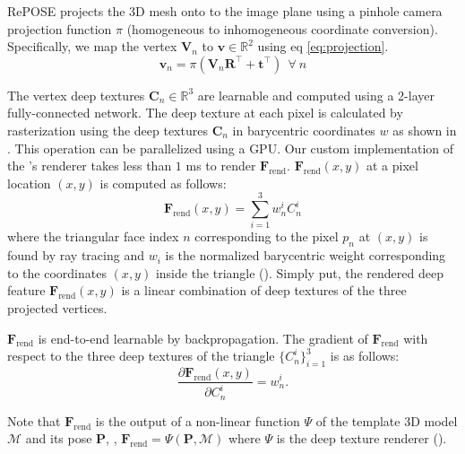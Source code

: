 \documentclass[10pt,twocolumn,letterpaper]{article}
\begin{document}
RePOSE projects the 3D mesh onto to the image plane using a pinhole camera projection function $\pi$ (homogeneous to inhomogeneous coordinate conversion). Specifically, we map the vertex $\mathbf{V}_n$ to $\mathbf{v} \in \mathbb{R}^{2}$ using eq \ref{eq:projection}. 
\begin{equation}
   \mathbf{v}_n = \pi \left( \mathbf{V}_n \mathbf{R}^{\top} + \mathbf{t}^{\top} \right) ~~ \forall ~ n
\label{eq:projection}
\end{equation}

The vertex deep textures $\mathbf{C}_n \in \mathbb{R}^{3}$ are learnable and computed using a 2-layer fully-connected network. The deep texture at each pixel is calculated by rasterization using the deep textures $\mathbf{C}_n$ in barycentric coordinates $w$ as shown in . This operation can be parallelized using a GPU. Our custom implementation of the \cite{kato2018renderer}'s renderer takes less than $1$ ms to render $\mathbf{F}_\text{rend}$. $\mathbf{F}_{\text{rend}}(x,y)$ at a pixel location $(x,y)$ is computed as follows:
\begin{equation}
  \mathbf{F}_{\text{rend}}(x,y) = \sum_{i=1}^{3} w_n^{i} C_n^{i}
  \label{eq:rasterizing}
\end{equation}
where the triangular face index $n$ corresponding to the pixel $p_n$ at $(x, y)$ is found by ray tracing and $w_i$ is the normalized barycentric weight corresponding to the coordinates $(x, y)$ inside the triangle (). Simply put, the rendered deep feature $\mathbf{F}_{\text{rend}}(x,y)$ is a linear combination of deep textures of the three projected vertices.

$\mathbf{F}_{\text{rend}}$ is end-to-end learnable by backpropagation. The gradient of $\mathbf{F}_{\text{rend}}$ with respect to the three deep textures of the triangle $\{C_n^i\}_{i=1}^3$ is as follows:
\begin{equation}
  \frac{\partial{ \mathbf{F}_\text{rend}(x,y) }}{ \partial{C_n^i}} = w_n^i.
  \label{eq:rasterizing_deriv}
\end{equation}

Note that $\mathbf{F}_\text{rend}$ is the output of a non-linear function $\Psi$ of the template 3D model $\mathcal{M}$ and its pose $\mathbf{P}$, \ie, $\mathbf{F}_\text{rend} = \Psi (\mathbf{P}, \mathcal{M})$ where $\Psi$ is the deep texture renderer ().
\end{document}
